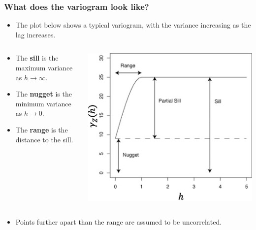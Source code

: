 \documentclass[parskip,12pt]{beamer}
\begin{document}
\begin{frame}
\frametitle{What does the variogram look like?}
 \begin{itemize}
\item The plot below shows a typical variogram, with the variance increasing as the lag increases.
\end{itemize}
\begin{columns}
\begin{column}{0.45\textwidth}
  \begin{itemize}
\item The \textbf{sill} is the maximum variance as $h \to \infty$.
\vspace{1mm}
\item The \textbf{nugget} is the minimum variance as $h \to 0$.
\vspace{1mm}
\item The \textbf{range} is the distance to the sill.
\end{itemize}
\end{column}
\begin{column}{0.45\textwidth}
    \begin{center}
     \includegraphics[width=\textwidth]{Variogram}
          \end{center}
\end{column}
\end{columns}
\vspace{3mm}
 \begin{itemize}
\item Points further apart than the range are assumed to be uncorrelated.
\end{itemize}
\end{frame}
\end{document}
